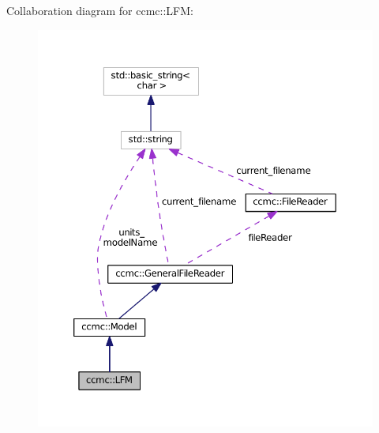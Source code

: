 Collaboration diagram for ccmc\-:\-:L\-F\-M\-:
\nopagebreak
\begin{figure}[H]
\begin{center}
\leavevmode
\includegraphics[width=350pt]{classccmc_1_1_l_f_m__coll__graph}
\end{center}
\end{figure}

